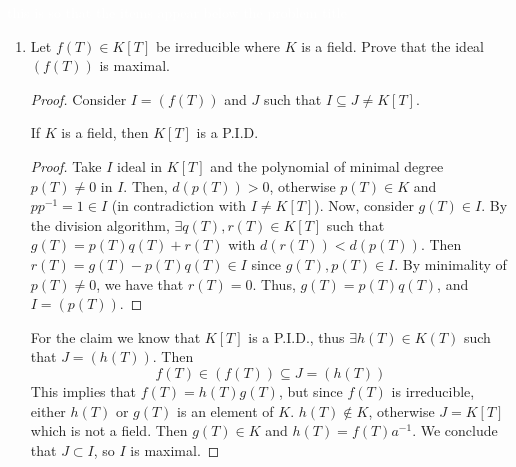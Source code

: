 







\begin{problem}\textcolor{white}{this is so that the items appear below the problem title}
    \begin{enumerate}[label=(\theproblem.\arabic*),ref=\theproblem.\arabic*]
        \item Let $f(T) \in K[T]$ be irreducible where $K$ is a field.
        Prove that the ideal $(f(T))$ is maximal.
            \begin{sol}
                \begin{proof}
                    Consider $I = (f(T))$ and $J$ such that $I \subseteq J \neq K[T]$.
                    \begin{claim} \label{itm:polynomial_field_is_pid}
                        If $K$ is a field, then $K[T]$ is a P.I.D.
                        \begin{proof}
                            Take $I$ ideal in $K[T]$ and the polynomial of minimal degree $p(T) \neq 0$ in $I$.
                            Then, $d(p(T)) > 0$, otherwise $p(T) \in K$ and $p p^{-1} = 1 \in I$ (in contradiction with $I \neq K[T]$).
                            Now, consider $g(T) \in I$.
                            By the division algorithm, $\exists q(T), r(T) \in K[T]$ such that $g(T) = p(T) q(T) + r(T)$ with $d(r(T)) < d(p(T))$.
                            Then $r(T) = g(T) - p(T) q(T) \in I$ since $g(T), p(T) \in I$.
                            By minimality of $p(T) \neq 0$, we have that $r(T) = 0$.
                            Thus, $g(T) = p(T) q(T)$, and $I = (p(T))$.
                        \end{proof}
                    \end{claim}
                    For the claim we know that $K[T]$ is a P.I.D., thus $\exists h(T) \in K(T)$ such that $J = (h(T))$.
                    Then
                    \[ f(T) \in (f(T)) \subseteq J = (h(T)) \]
                    This implies that $f(T) = h(T) g(T)$, but since $f(T)$ is irreducible, either $h(T)$ or $g(T)$ is an element of $K$.
                    $h(T) \notin K$, otherwise $J = K[T]$ which is not a field.
                    Then $g(T) \in K$ and $h(T) = f(T) a^{-1}$.
                    We conclude that $J \subset I$, so $I$ is maximal.
                \end{proof}
            \end{sol}

\end{enumerate}
\end{problem}
